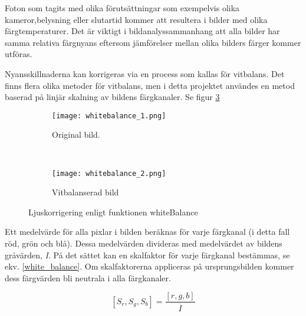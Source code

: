 \documentclass[a4paper,12pt,oneside,final]{extbook}
\begin{document}
Foton som tagits med olika förutsättningar som exempelvis olika kameror,belysning eller slutartid kommer att resultera i bilder med olika färgtemperaturer. Det är viktigt i bildanalyssammanhang att alla bilder har samma relativa färgnyans eftersom jämförelser mellan olika bilders färger kommer utföras.

Nyansskillnaderna kan korrigeras via en process som kallas för vitbalans. Det finns flera olika metoder för vitbalans, men i detta projektet användes en metod baserad på linjär skalning av bildens färgkanaler. Se figur \ref{fig:whitebalance} 




\begin{figure}[h]
    \centering
    \begin{subfigure}[b]{0.4\textwidth}
        \texttt{[image: whitebalance\_1.png]}
        \caption{Original bild.}
        \label{fig:whitebalance_1}
    \end{subfigure}
    ~ %
    \begin{subfigure}[b]{0.4\textwidth}
        \texttt{[image: whitebalance\_2.png]}
        \caption{Vitbalanserad bild}
        \label{fig:whitebalance_2}
    \end{subfigure}

    \caption{Ljuskorrigering enligt funktionen whiteBalance \cite{whitebalance} }
    \label{fig:whitebalance}
\end{figure}


Ett medelvärde för alla pixlar i bilden beräknas för varje färgkanal (i detta fall röd, grön och blå). Dessa medelvärden divideras med medelvärdet av bildens gråvärden, \textit{I}. På det sättet kan en skalfaktor för varje färgkanal bestämmas, se ekv. \ref{white_balance}. Om skalfaktorerna appliceras på ursprungsbilden kommer dess färgvärden bli neutrala i alla färgkanaler.

\begin{equation} \label{white_balance}
[S_{r},S_{g},S_{b}] = \frac{ [r,g,b] }{ \overline{I} }
\end{equation}
\end{document}

